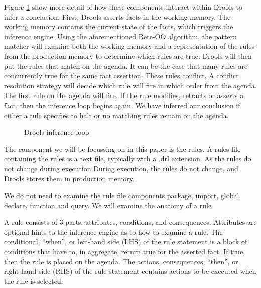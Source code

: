 Figure \ref{fig:Drools_inference_loop} show more detail of how these components interact within Drools to infer a conclusion.
First, Drools asserts facts in the working memory.
The working memory contains the current state of the facts, which triggers the inference engine.
Using the aforementioned Rete-OO algorithm, the pattern matcher will examine both the working memory and a representation of the rules from the production memory to determine which rules are true.
Drools will then put the rules that match on the agenda.
It can be the case that many rules are concurrently true for the same fact assertion.
These rules conflict.
A conflict resolution strategy will decide which rule will fire in which order from the agenda.
The first rule on the agenda will fire.
If the rule modifies, retracts or asserts a fact, then the inference loop begins again.
We have inferred our conclusion if either a rule specifies to halt or no matching rules remain on the agenda.

\begin{figure}[h]
    \centering
    \caption{Drools inference loop}
    \label{fig:Drools_inference_loop}
\end{figure}

The component we will be focussing on in this paper is the rules.
A rules file containing the rules is a text file, typically with a .drl extension.
As the rules do not change during execution
During execution, the rules do not change, and Drools stores them in production memory.

We do not need to examine the rule file components package, import, global, declare, function and query.
We will examine the anatomy of a rule.

A rule consists of 3 parts: attributes, conditions, and consequences.
Attributes are optional hints to the inference engine as to how to examine a rule.
The conditional, ``when'', or left-hand side (LHS) of the rule statement is a block of conditions that have to, in aggregate, return true for the asserted fact. If true, then the rule is placed on the agenda.
The actions, consequences, ``then'', or right-hand side (RHS) of the rule statement contains actions to be executed when the rule is selected.


